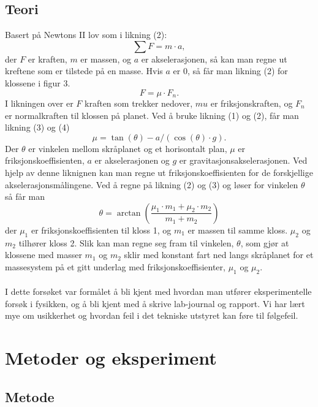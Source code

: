 \documentclass[10pt,a4paper]{report}
\begin{document}
\section*{Teori}
Basert på Newtons II lov som i likning (2): 
\begin{equation}
\sum{F} = m \cdot a,
\end{equation} der $F$ er kraften, $m$ er massen, og $a$ er akselerasjonen, så kan man regne ut kreftene som er tilstede på en masse. Hvis $a$ er 0, så får man likning (2) for klossene i figur 3. 
\begin{equation}
F = \mu \cdot F_n.
\end{equation}
I likningen over er $F$ kraften som trekker nedover, $mu$ er friksjonskraften, og $F_n$ er normalkraften til klossen på planet.
Ved å bruke likning (1) og (2), får man likning (3) og (4)
\begin{equation}
\mu = \tan(\theta)-a/(\cos(\theta)\cdot g).
\end{equation}
Der $\theta$ er vinkelen mellom skråplanet og et horisontalt plan, $\mu$ er friksjonskoeffisienten, $a$ er akselerasjonen og $g$ er gravitasjonsakselerasjonen. Ved hjelp av denne liknignen kan man regne ut friksjonskoeffisienten for de forskjellige akselerasjonsmålingene. Ved å regne på likning (2) og (3) og løser for vinkelen $\theta$ så får man
\begin{equation}
\theta = \arctan(\frac{\mu_1 \cdot m_1+\mu_2 \cdot m_2}{m_1+m_2})
\end{equation}
der $\mu_1$ er friksjonskoeffisienten til kloss 1, og $m_1$ er massen til samme kloss. $\mu_2$ og $m_2$ tilhører kloss 2. Slik kan man regne seg fram til vinkelen, $\theta$, som gjør at klossene med masser $m_1$ og $m_2$ sklir med konstant fart ned langs skråplanet for et massesystem på et gitt underlag med friksjonskoeffisienter, $\mu_1$ og $\mu_2$.\\
\\I dette forsøket var formålet å bli kjent med hvordan man utfører eksperimentelle forsøk i fysikken, og å bli kjent med å skrive lab-journal og rapport. Vi har lært mye om usikkerhet og hvordan feil i det tekniske utstyret kan føre til følgefeil.

\chapter*{Metoder og eksperiment}
\section*{Metode}
\end{document}
